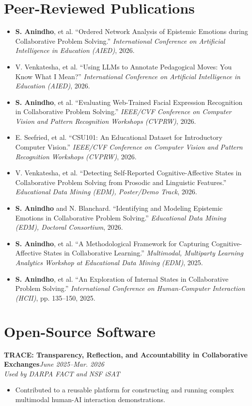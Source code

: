 \documentclass[9pt,letterpaper]{article}
\newcommand{\project}[3]{\textbf{#1}\hfill\textit{#3}\\\textit{#2}\vspace{-3pt}}
\newcommand{\pub}[1]{\item #1}
\begin{document}
\section{Peer-Reviewed Publications}
\begin{itemize}
\pub{\textbf{S. Anindho}, et al. ``Ordered Network Analysis of Epistemic Emotions during Collaborative Problem Solving.'' \textit{International Conference on Artificial Intelligence in Education (AIED)}, 2026.}
\pub{V. Venkatesha, et al. ``Using LLMs to Annotate Pedagogical Moves: You Know What I Mean?'' \textit{International Conference on Artificial Intelligence in Education (AIED)}, 2026.}
\pub{\textbf{S. Anindho}, et al. ``Evaluating Web-Trained Facial Expression Recognition in Collaborative Problem Solving.'' \textit{IEEE/CVF Conference on Computer Vision and Pattern Recognition Workshops (CVPRW)}, 2026.}
\pub{E. Seefried, et al. ``CSU101: An Educational Dataset for Introductory Computer Vision.'' \textit{IEEE/CVF Conference on Computer Vision and Pattern Recognition Workshops (CVPRW)}, 2026.}
\pub{V. Venkatesha, et al. ``Detecting Self-Reported Cognitive-Affective States in Collaborative Problem Solving from Prosodic and Linguistic Features.'' \textit{Educational Data Mining (EDM), Poster/Demo Track}, 2026.}
\pub{\textbf{S. Anindho} and N. Blanchard. ``Identifying and Modeling Epistemic Emotions in Collaborative Problem Solving.'' \textit{Educational Data Mining (EDM), Doctoral Consortium}, 2026.}
\pub{\textbf{S. Anindho}, et al. ``A Methodological Framework for Capturing Cognitive-Affective States in Collaborative Learning.'' \textit{Multimodal, Multiparty Learning Analytics Workshop at Educational Data Mining (EDM)}, 2025.}
\pub{\textbf{S. Anindho}, et al. ``An Exploration of Internal States in Collaborative Problem Solving.'' \textit{International Conference on Human-Computer Interaction (HCII)}, pp. 135--150, 2025.}
\end{itemize}

\section{Open-Source Software}
\project{TRACE: Transparency, Reflection, and Accountability in Collaborative Exchanges}{Used by DARPA FACT and NSF iSAT}{June 2025--Mar. 2026}
\begin{itemize}
\item Contributed to a reusable platform for constructing and running complex multimodal human-AI interaction demonstrations.
\end{itemize}
\end{document}
